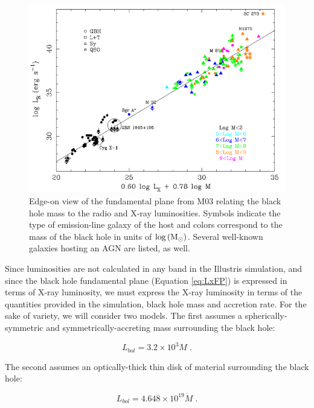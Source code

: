 \begin{figure}
\centering{}\includegraphics[clip,scale=0.35]{Figures/FP} \protect\caption{\label{fig:Fp}Edge-on view of the fundamental plane from M03 relating
the black hole mass to the radio and X-ray luminosities. Symbols indicate
the type of emission-line galaxy of the host and colors correspond
to the mass of the black hole in units of $\log\left({\rm M}_{\odot}\right)$.
Several well-known galaxies hosting an AGN are listed, as well.}
\end{figure}




Since luminosities are not calculated in any band in the Illustris
simulation, and since the black hole fundamental plane (Equation
\ref{eq:LxFP}) is expressed in terms of X-ray luminosity, we must
express the X-ray luminosity in terms of the quantities provided in
the simulation, black hole mass and accretion
rate. For the sake of variety, we will consider two models.
The first assumes a spherically-symmetric and symmetrically-accreting
mass surrounding the black hole:

\begin{equation}
L_{bol}=3.2\times10^3M \;.
\label{eq:Lbol_propto_m}
\end{equation}

The second assumes an optically-thick thin disk of material surrounding the black hole:

\begin{equation}
L_{bol}=4.648\times10^{19}\dot{M} \;.
\label{eq:Lbol_propto_dotm}
\end{equation}


